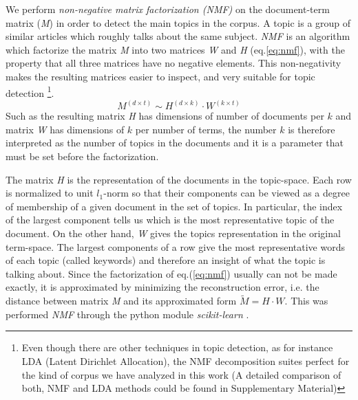 \documentclass{bmcart}
\begin{document}
\par We perform \emph{non-negative matrix factorization (NMF)} \cite{xu2003document, lee1999learning} on the document-term matrix (\emph{M}) in order to detect the main topics in the corpus. A topic is a group of similar articles which roughly talks about the same subject. 
\emph{NMF} is an algorithm which factorize the matrix \emph{M} into two matrices \emph{W} and \emph{H} (eq.\ref{eq:nmf}), with the property that all three matrices have no negative elements. This non-negativity makes the resulting matrices easier to inspect, and very suitable for topic detection \footnote{ Even though there are other techniques in topic detection, as for instance LDA (Latent Dirichlet Allocation), the NMF decomposition suites perfect for the kind of corpus we  have analyzed in this work (A detailed comparison of both, NMF and LDA methods could be found in Supplementary Material)}. 
\begin{equation}
M^{(d \times t)} \sim H^{(d \times k)} \cdot W^{(k \times t)}
\label{eq:nmf}
\end{equation}
Such as the resulting matrix \emph{H} has dimensions of number of documents per $k$ and matrix \emph{W} has dimensions of $k$ per number of terms, the number $k$ is therefore interpreted as the number of topics in the documents and it is a parameter that must be set before the factorization.
\par The matrix \emph{H} is the representation of the documents in the topic-space. Each row is normalized to unit $l_1$-norm so that their components can be viewed as a degree of membership of a given document in the set of topics. In particular, the index of the largest component tells us which is the most representative topic of the document.
On the other hand, \emph{W} gives the topics representation in the original term-space. The largest components of a row give the most representative words of each topic (called keywords) and therefore an insight of what the topic is talking about.
Since the factorization of eq.(\ref{eq:nmf}) usually can not be made exactly, it is approximated by minimizing the reconstruction error, i.e. the distance between matrix \emph{M} and its approximated form $\tilde{M} = H \cdot W$. This was performed \emph{NMF} through the python module \emph{scikit-learn} \cite{scikit-learn}.
\end{document}

